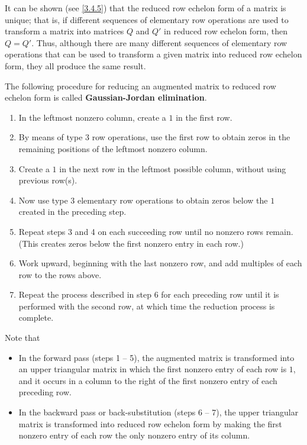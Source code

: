 \begin{note}
	It can be shown (see \cref{3.4.5}) that the reduced row echelon form of a matrix is unique;
	that is, if different sequences of elementary row operations are used to transform a matrix into matrices \(Q\) and \(Q'\) in reduced row echelon form, then \(Q = Q'\).
	Thus, although there are many different sequences of elementary row operations that can be used to transform a given matrix into reduced row echelon form, they all produce the same result.
\end{note}

\begin{defn}\label{3.4.4}
	The following procedure for reducing an augmented matrix to reduced row echelon form is called \textbf{Gaussian-Jordan elimination}.
	\begin{enumerate}[label=\arabic*.]
		\item In the leftmost nonzero column, create a \(1\) in the first row.
		\item By means of type 3 row operations, use the first row to obtain zeros in the remaining positions of the leftmost nonzero column.
		\item Create a \(1\) in the next row in the leftmost possible column, without using previous row(s).
		\item Now use type 3 elementary row operations to obtain zeros below the \(1\) created in the preceding step.
		\item Repeat steps 3 and 4 on each succeeding row until no nonzero rows remain.
		      (This creates zeros below the first nonzero entry in each row.)
		\item Work upward, beginning with the last nonzero row, and add multiples of each row to the rows above.
		\item Repeat the process described in step 6 for each preceding row until it is performed with the second row, at which time the reduction process is complete.
	\end{enumerate}
	Note that
	\begin{itemize}
		\item In the forward pass (steps 1 -- 5), the augmented matrix is transformed into an upper triangular matrix in which the first nonzero entry of each row is \(1\), and it occurs in a column to the right of the first nonzero entry of each preceding row.
		\item In the backward pass or back-substitution (steps 6 -- 7), the upper triangular matrix is transformed into reduced row echelon form by making the first nonzero entry of each row the only nonzero entry of its column.
	\end{itemize}
\end{defn}

